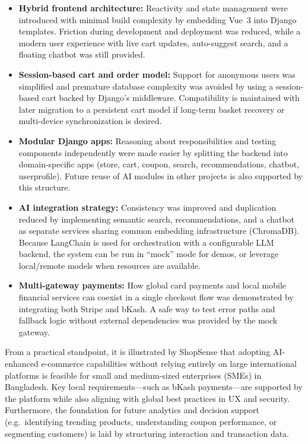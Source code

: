 \begin{itemize}
  \item \textbf{Hybrid frontend architecture:} Reactivity and state management were introduced with minimal build complexity by embedding Vue~3 into Django templates. Friction during development and deployment was reduced, while a modern user experience with live cart updates, auto-suggest search, and a floating chatbot was still provided.
  \item \textbf{Session-based cart and order model:} Support for anonymous users was simplified and premature database complexity was avoided by using a session-based cart backed by Django’s middleware. Compatibility is maintained with later migration to a persistent cart model if long-term basket recovery or multi-device synchronization is desired.
  \item \textbf{Modular Django apps:} Reasoning about responsibilities and testing components independently were made easier by splitting the backend into domain-specific apps (store, cart, coupon, search, recommendations, chatbot, userprofile). Future reuse of AI modules in other projects is also supported by this structure.
  \item \textbf{AI integration strategy:} Consistency was improved and duplication reduced by implementing semantic search, recommendations, and a chatbot as separate services sharing common embedding infrastructure (ChromaDB). Because LangChain is used for orchestration with a configurable LLM backend, the system can be run in “mock” mode for demos, or leverage local/remote models when resources are available.
  \item \textbf{Multi-gateway payments:} How global card payments and local mobile financial services can coexist in a single checkout flow was demonstrated by integrating both Stripe and bKash. A safe way to test error paths and fallback logic without external dependencies was provided by the mock gateway.
\end{itemize}

From a practical standpoint, it is illustrated by ShopSense that adopting AI-enhanced e-commerce capabilities without relying entirely on large international platforms is feasible for small and medium-sized enterprises (SMEs) in Bangladesh. Key local requirements—such as bKash payments—are supported by the platform while also aligning with global best practices in UX and security. Furthermore, the foundation for future analytics and decision support (e.g.\ identifying trending products, understanding coupon performance, or segmenting customers) is laid by structuring interaction and transaction data.

